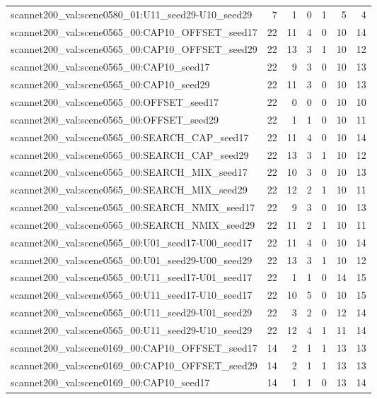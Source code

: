 \begin{table}[t]
\begin{tabular}{lrrrrrr}
scannet200\_val:scene0580\_01:U11\_seed29-U10\_seed29 & 7 & 1 & 0 & 1 & 5 & 4 \\
scannet200\_val:scene0565\_00:CAP10\_OFFSET\_seed17 & 22 & 11 & 4 & 0 & 10 & 14 \\
scannet200\_val:scene0565\_00:CAP10\_OFFSET\_seed29 & 22 & 13 & 3 & 1 & 10 & 12 \\
scannet200\_val:scene0565\_00:CAP10\_seed17 & 22 & 9 & 3 & 0 & 10 & 13 \\
scannet200\_val:scene0565\_00:CAP10\_seed29 & 22 & 11 & 3 & 0 & 10 & 13 \\
scannet200\_val:scene0565\_00:OFFSET\_seed17 & 22 & 0 & 0 & 0 & 10 & 10 \\
scannet200\_val:scene0565\_00:OFFSET\_seed29 & 22 & 1 & 1 & 0 & 10 & 11 \\
scannet200\_val:scene0565\_00:SEARCH\_CAP\_seed17 & 22 & 11 & 4 & 0 & 10 & 14 \\
scannet200\_val:scene0565\_00:SEARCH\_CAP\_seed29 & 22 & 13 & 3 & 1 & 10 & 12 \\
scannet200\_val:scene0565\_00:SEARCH\_MIX\_seed17 & 22 & 10 & 3 & 0 & 10 & 13 \\
scannet200\_val:scene0565\_00:SEARCH\_MIX\_seed29 & 22 & 12 & 2 & 1 & 10 & 11 \\
scannet200\_val:scene0565\_00:SEARCH\_NMIX\_seed17 & 22 & 9 & 3 & 0 & 10 & 13 \\
scannet200\_val:scene0565\_00:SEARCH\_NMIX\_seed29 & 22 & 11 & 2 & 1 & 10 & 11 \\
scannet200\_val:scene0565\_00:U01\_seed17-U00\_seed17 & 22 & 11 & 4 & 0 & 10 & 14 \\
scannet200\_val:scene0565\_00:U01\_seed29-U00\_seed29 & 22 & 13 & 3 & 1 & 10 & 12 \\
scannet200\_val:scene0565\_00:U11\_seed17-U01\_seed17 & 22 & 1 & 1 & 0 & 14 & 15 \\
scannet200\_val:scene0565\_00:U11\_seed17-U10\_seed17 & 22 & 10 & 5 & 0 & 10 & 15 \\
scannet200\_val:scene0565\_00:U11\_seed29-U01\_seed29 & 22 & 3 & 2 & 0 & 12 & 14 \\
scannet200\_val:scene0565\_00:U11\_seed29-U10\_seed29 & 22 & 12 & 4 & 1 & 11 & 14 \\
scannet200\_val:scene0169\_00:CAP10\_OFFSET\_seed17 & 14 & 2 & 1 & 1 & 13 & 13 \\
scannet200\_val:scene0169\_00:CAP10\_OFFSET\_seed29 & 14 & 2 & 1 & 1 & 13 & 13 \\
scannet200\_val:scene0169\_00:CAP10\_seed17 & 14 & 1 & 1 & 0 & 13 & 14 \\

\end{tabular}
\end{table}
